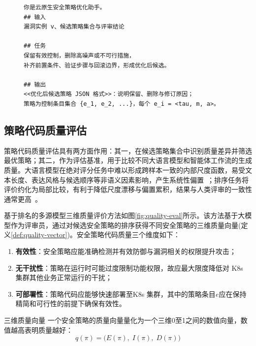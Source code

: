 \begin{figure}[htb]
    \centering
    \setlength{\abovecaptionskip}{3pt}
    \setlength{\belowcaptionskip}{0pt}
    \begin{tcolorbox}[enhanced,colback=gray!3,colframe=gray!55,boxrule=0.4pt,arc=1mm,left=2mm,right=2mm,top=0.5mm,bottom=0.5mm,title={\small \textbf{策略优化智能体提示词简化示例}},fonttitle=\bfseries,coltitle=black]
    \begin{BVerbatim}[fontsize=\small,baselinestretch=0.8]
你是云原生安全策略优化助手。
## 输入
漏洞实例 v、候选策略集合与评审结论

## 任务
保留有效控制，删除高噪声或不可行措施，
补齐前置条件、验证步骤与回滚边界，形成优化后候选。

## 输出
<<优化后候选策略 JSON 格式>>：说明保留、删除与修订原因；
策略为控制条目集合 {e_1, e_2, ...}，每个 e_i = <tau, m, a>。
    \end{BVerbatim}
    \end{tcolorbox}
    \label{fig:prompt-strategy-optimize}
\end{figure}

\subsection{策略代码质量评估}\label{subsec:quality}

策略代码质量评估具有两方面作用：其一，在候选策略集合中识别质量差异并筛选最优策略；其二，作为评估基准，用于比较不同大语言模型和智能体工作流的生成质量。大语言模型在绝对评分任务中难以形成跨样本一致的内部尺度函数，易受文本长度、表达风格与候选顺序等非语义因素影响，产生系统性偏置~\cite{wu2024scoring,wang2023fair,hwang2025persuasion}；排序任务将评价约化为局部比较，有利于降低尺度漂移与偏置累积，结果与人类评审的一致性通常更高~\cite{velez2025writing,liu2023geval,wang2025trustjudge}。

基于排名的多源模型三维质量评价方法如图\ref{fig:quality-eval}所示。该方法基于大模型作为评审员，通过对候选安全策略的排序获得不同安全策略的三维质量向量(定义\ref{def:quality-vector})。安全策略代码质量三个维度如下：
\begin{enumerate}[label=(\arabic*),leftmargin=*]
    \item \textbf{有效性}：安全策略应能准确检测并有效防御与漏洞相关的权限提升攻击；
    \item \textbf{无干扰性}：策略在运行时可能过度限制功能权限，故应最大限度降低对 K8s 集群其他业务正常运行的干扰；
    \item \textbf{可部署性}：策略代码应能够快速部署至K8s 集群，其中的策略条目${e}$应在保持精简和可行性的前提下确保有效性。
\end{enumerate}
\begin{flatdefinition}{三维质量向量}\label{def:quality-vector}
一个安全策略的质量向量量化为一个三维0至1之间的数值向量，数值越高表明质量越好：
\begin{equation}\label{eq:quality-vec}
q(\pi) = \bigl(E(\pi),\;I(\pi),\;D(\pi)\bigr)
\end{equation}
\end{flatdefinition}


